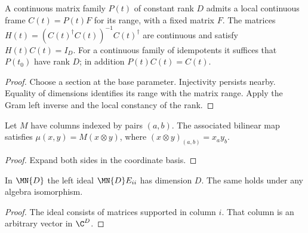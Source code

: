 \begin{lemma}
    \label{thm:spt_continuous_idempotent_frame}
    \leanok
    A continuous matrix family $P(t)$ of constant rank $D$ admits a local
    continuous frame $C(t)=P(t)F$ for its range, with a fixed matrix $F$.
    The matrices $H(t)=(C(t)^\dagger C(t))^{-1}C(t)^\dagger$ are continuous
    and satisfy $H(t)C(t)=I_D$.
    For a continuous family of idempotents it suffices that $P(t_0)$ have
    rank $D$; in addition $P(t)C(t)=C(t)$.
\end{lemma}

\begin{proof}
    \leanok
    Choose a section at the base parameter. Injectivity persists nearby.
    Equality of dimensions identifies its range with the matrix range.
    Apply the Gram left inverse and the local constancy of the rank.
\end{proof}

\begin{lemma}
    \label{thm:spt_bilinear_coordinates}
    \leanok
    Let $M$ have columns indexed by pairs $(a,b)$. The associated bilinear
    map satisfies $\mu(x,y)=M(x\otimes y)$, where
    $(x\otimes y)_{(a,b)}=x_a y_b$.
\end{lemma}

\begin{proof}
    \leanok
    Expand both sides in the coordinate basis.
\end{proof}

\begin{lemma}
    \label{thm:spt_primitive_left_ideal_dimension}
    \leanok
    In $\MN{D}$ the left ideal $\MN{D}E_{ii}$ has
    dimension $D$. The same holds under any algebra
    isomorphism.
\end{lemma}

\begin{proof}
    \leanok
    The ideal consists of matrices supported in column $i$.
    That column is an arbitrary vector in $\C^D$.
\end{proof}
